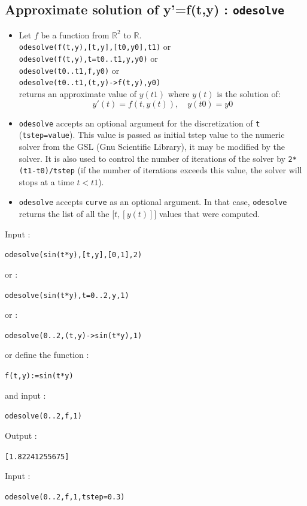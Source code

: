 \documentclass[a4paper,11pt]{book}
\begin{document}
\subsection{Approximate solution of y'=f(t,y) : {\tt odesolve}}
\begin{itemize}
\item Let $f$ be a function from $\mathbb R^2$ to $\mathbb R$.\\
 {\tt odesolve(f(t,y),[t,y],[t0,y0],t1)} or\\
{\tt odesolve(f(t,y),t=t0..t1,y,y0)} or\\
{\tt odesolve(t0..t1,f,y0)} or\\
{\tt odesolve(t0..t1,(t,y)->f(t,y),y0)}\\
returns an approximate value of $y(t1)$ where $y(t)$ is the  
solution of:
\[ y'(t)=f(t,y(t)), \quad  y(t0)=y0 \]
\item {\tt odesolve} accepts an optional argument for the 
discretization of {\tt t} ({\tt tstep=value}). 
This value is passed as initial tstep value to the numeric solver
from the GSL (Gnu Scientific Library), it may be modified
by the solver. It is also used to control the number of iterations
of the solver by {\tt 2*(t1-t0)/tstep} (if the number
of iterations exceeds this value, the solver will stops at a time $t<t1$).
\item {\tt odesolve} accepts {\tt curve} as an optional argument.
In that case, 
{\tt odesolve} returns the list of all the [$t,[y(t)]$] values
that were computed.
\end{itemize}
Input :
\begin{center}{\tt odesolve(sin(t*y),[t,y],[0,1],2)}\end{center}
or :
\begin{center}{\tt odesolve(sin(t*y),t=0..2,y,1)}\end{center}
or :
\begin{center}{\tt odesolve(0..2,(t,y)->sin(t*y),1)}\end{center}
or define the function :
\begin{center}{\tt f(t,y):=sin(t*y)} \end{center}
and input :
\begin{center}{\tt odesolve(0..2,f,1)}\end{center}
Output :
\begin{center}{\tt [1.82241255675]}\end{center}
Input :
\begin{center}{\tt odesolve(0..2,f,1,tstep=0.3)}\end{center}
\end{document}
